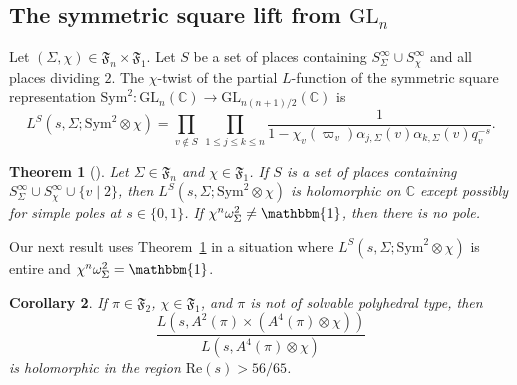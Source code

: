 \documentclass[11pt]{amsart}
\newtheorem{theorem}{Theorem}[section]
\newtheorem{corollary}[theorem]{Corollary}
\theoremstyle{remark}
\newcommand{\re}{\mathrm{Re}}
\numberwithin{equation}{section}
\begin{document}
\subsection{The symmetric square lift from $\mathrm{GL}_n$}

Let $(\Sigma,\chi)\in\mathfrak{F}_{n}\times\mathfrak{F}_{1}$.  Let $S$ be a set of places containing $S_{\Sigma}^{\infty}\cup S_{\chi}^{\infty}$ and all places dividing $2$.  The $\chi$-twist of the partial $L$-function of the symmetric square representation $\mathrm{Sym}^2\colon \mathrm{GL}_n(\mathbb{C})\to\mathrm{GL}_{n(n+1)/2}(\mathbb{C})$ is
\begin{equation}
\label{eqn:SYM2def}
L^S(s,\Sigma;\mathrm{Sym}^2\otimes\chi)=\prod_{v\notin S}~\prod_{1\leq j\leq k\leq n}\frac{1}{1-\chi_v(\varpi_v)\alpha_{j,\Sigma}(v)\alpha_{k,\Sigma}(v)q_v^{-s}}.
\end{equation}
\begin{theorem}[{\cite[Theorem 7.1]{Takeda}}]
\label{thm:sym2}
Let $\Sigma\in\mathfrak{F}_{n}$ and $\chi\in\mathfrak{F}_{1}$.  If $S$ is a set of places containing $S_{\Sigma}^{\infty}\cup S_{\chi}^{\infty}\cup\{v\mid 2\}$, then $L^S(s,\Sigma;\mathrm{Sym}^2\otimes\chi)$ is holomorphic on $\mathbb{C}$ except possibly for simple poles at $s\in\{0,1\}$.  If $\chi^n \omega_{\Sigma}^2\neq\mathbbm{1}$, then there is no pole.
\end{theorem}
Our next result uses Theorem~\ref{thm:sym2} in a situation where $L^S(s,\Sigma;\mathrm{Sym}^2\otimes\chi)$ is entire and $\chi^n\omega_{\Sigma}^2=\mathbbm{1}$.
\begin{corollary}
\label{cor:sym2}
If $\pi\in\mathfrak{F}_2$, $\chi\in\mathfrak{F}_1$, and $\pi$ is not of solvable polyhedral type, then
\begin{equation}
\label{eqn:sym2}
\frac{L(s,A^2(\pi)\times(A^4(\pi)\otimes\chi))}{L(s,A^4(\pi)\otimes\chi)}
\end{equation}
is holomorphic in the region $\re(s)>56/65$.
\end{corollary}
\end{document}
